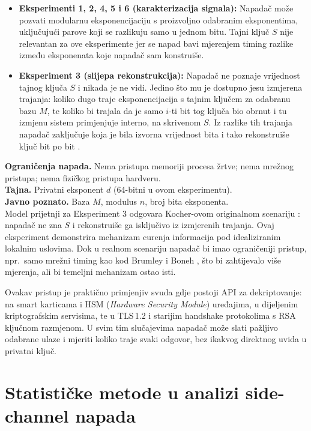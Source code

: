 \begin{itemize}
\item \textbf{Eksperimenti 1, 2, 4, 5 i 6 (karakterizacija signala):} Napadač može pozvati modularnu eksponencijaciju s proizvoljno odabranim eksponentima, uključujući parove koji se razlikuju samo u jednom bitu. Tajni ključ $S$ nije relevantan za ove eksperimente jer se napad bavi mjerenjem timing razlike između eksponenata koje napadač sam konstruiše.
\item \textbf{Eksperiment 3 (slijepa rekonstrukcija):} Napadač ne poznaje vrijednost tajnog ključa $S$ i nikada je ne vidi. Jedino što mu je dostupno jesu izmjerena trajanja: koliko dugo traje eksponencijacija s tajnim ključem za odabranu bazu $M$, te koliko bi trajala da je samo $i$-ti bit tog ključa bio obrnut i tu izmjenu sistem primjenjuje interno, na skrivenom $S$. Iz razlike tih trajanja napadač zaključuje koja je bila izvorna vrijednost bita i tako rekonstruiše ključ bit po bit \cite{kocher1996}.
\end{itemize}

\textbf{Ograničenja napada.}
Nema pristupa memoriji procesa žrtve; nema mrežnog pristupa; nema fizičkog pristupa hardveru.
\\

\textbf{Tajna.}
Privatni eksponent $d$ (64-bitni u ovom eksperimentu).
\\

\textbf{Javno poznato.}
Baza $M$, modulus $n$, broj bita eksponenta.
\\

Model prijetnji za Eksperiment 3 odgovara Kocher-ovom originalnom scenariju \cite{kocher1996}: napadač ne zna $S$ i rekonstruiše ga isključivo iz izmjerenih trajanja. Ovaj eksperiment demonstrira mehanizam curenja informacija pod idealiziranim lokalnim uslovima. Dok u realnom scenariju napadač bi imao ograničeniji pristup, npr.\ samo mrežni timing kao kod Brumley i Boneh \cite{brumley2003}, što bi zahtijevalo više mjerenja, ali bi temeljni mehanizam ostao isti.

Ovakav pristup je praktično primjenjiv svuda gdje postoji API za dekriptovanje: na smart karticama i HSM (\textit{Hardware Security Module}) uređajima, u dijeljenim kriptografskim servisima, te u TLS\,1.2 i starijim handshake protokolima s RSA ključnom razmjenom. U svim tim slučajevima napadač može slati pažljivo odabrane ulaze i mjeriti koliko traje svaki odgovor, bez ikakvog direktnog uvida u privatni ključ.

\section{Statističke metode u analizi side-channel napada}
\label{sec:statistika}

